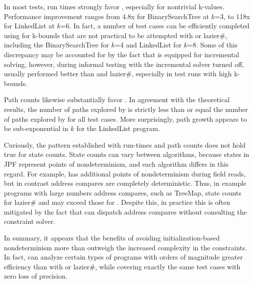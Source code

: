In most tests, run times strongly favor \symtxt{}, especially for nontrivial k-values. Performance improvement ranges from 4.8x for BinarySearchTree at $k$=3, to 118x for LinkedList at $k$=6. In fact, a number of test cases can be efficiently completed using \symtxt{} for k-bounds that are not practical to be attempted with \gsetxt{} or lazier\#, including the BinarySearchTree for $k$=4 and LinkedList for $k$=8. Some of this discrepancy may be accounted for by the fact that \symtxt{} is equipped for incremental solving, however, during informal testing with the incremental solver turned off, \symtxt{} usually performed better than \gsetxt{} and lazier\#, especially in test runs with high k-bounds. 

Path counts likewise substantially favor \symtxt{}. In agreement with the theoretical results, the number of paths explored by \symtxt{} is strictly less than or equal the number of paths explored by \gsetxt{} for all test cases. More surprisingly, \symtxt{} path growth appears to be sub-exponential in $k$ for the LinkedList program.

Curiously, the pattern established with run-times and path counts does not hold true for state counts. State counts can vary between algorithms, because states in JPF represent points of nondeterminism, and each algorithm differs in this regard. For example, \gsetxt{} has additional points of nondeterminism during field reads, but in contrast address compares are completely deterministic. Thus, in example programs with large numbers address compares, such as TreeMap, state counts for lazier\# and \symtxt{} may exceed those for \gsetxt{}. Despite this, in practice this is often mitigated by the fact that \symtxt{} can dispatch address compares without consulting the constraint solver.

In summary, it appears that the benefits of avoiding initialization-based nondeterminism more than outweigh the increased complexity in the constraints. In fact, \symtxt{} can analyze certain types of programs with orders of magnitude greater efficiency than with \gsetxt{} or lazier\#, while covering exactly the same test cases with zero loss of precision.